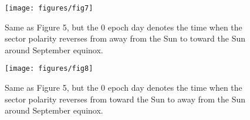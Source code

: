 \documentclass[12pt,a4paper]{article}
\begin{document}
\begin{figure}[!ht]
    \begin{center}
        \texttt{[image: figures/fig7]}
        \caption{Same as Figure 5, but the 0 epoch day denotes the time when the sector polarity reverses from away from the Sun to toward the Sun around September equinox.}
        \label{fig7}
    \end{center}
\end{figure}
\newpage

\begin{figure}[!ht]
    \begin{center}
        \texttt{[image: figures/fig8]}
        \caption{Same as Figure 5, but the 0 epoch day denotes the time when the sector polarity reverses from toward the Sun to away from the Sun around September equinox.}
        \label{fig8}
    \end{center}
\end{figure}
\newpage
\end{document}
